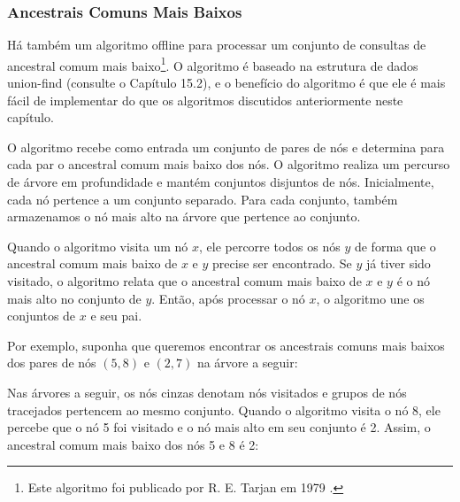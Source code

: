 \subsubsection{Ancestrais Comuns Mais Baixos}

Há também um algoritmo offline para processar um conjunto de consultas de ancestral comum mais baixo\footnote{Este algoritmo foi publicado por R. E. Tarjan em 1979 \cite{tar79}.}. O algoritmo é baseado na estrutura de dados union-find (consulte o Capítulo 15.2), e o benefício do algoritmo é que ele é mais fácil de implementar do que os algoritmos discutidos anteriormente neste capítulo.

O algoritmo recebe como entrada um conjunto de pares de nós e determina para cada par o ancestral comum mais baixo dos nós. O algoritmo realiza um percurso de árvore em profundidade e mantém conjuntos disjuntos de nós. Inicialmente, cada nó pertence a um conjunto separado. Para cada conjunto, também armazenamos o nó mais alto na árvore que pertence ao conjunto.

Quando o algoritmo visita um nó $x$, ele percorre todos os nós $y$ de forma que o ancestral comum mais baixo de $x$ e $y$ precise ser encontrado. Se $y$ já tiver sido visitado, o algoritmo relata que o ancestral comum mais baixo de $x$ e $y$ é o nó mais alto no conjunto de $y$. Então, após processar o nó $x$, o algoritmo une os conjuntos de $x$ e seu pai.

Por exemplo, suponha que queremos encontrar os ancestrais comuns mais baixos dos pares de nós $(5,8)$ e $(2,7)$ na árvore a seguir:

\begin{center}
\end{center}

Nas árvores a seguir, os nós cinzas denotam nós visitados e grupos de nós tracejados pertencem ao mesmo conjunto. Quando o algoritmo visita o nó 8, ele percebe que o nó 5 foi visitado e o nó mais alto em seu conjunto é 2. Assim, o ancestral comum mais baixo dos nós 5 e 8 é 2:

